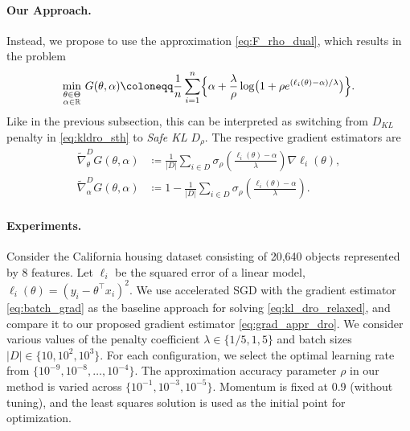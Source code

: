 \documentclass{article}
\newcommand{\R}{\mathbb{R}}
\newcommand*{\eqset}{\coloneqq}
\theoremstyle{plain}
\theoremstyle{definition}
\theoremstyle{remark}
\begin{document}
\paragraph{Our Approach.}
Instead, we propose to use the approximation \eqref{eq:F_rho_dual}, which results in the problem
\begin{equation}\label{eq:appr_kl_dro}
    \min_{\substack{\theta \in \Theta \\ \alpha \in \R}}\, G(\theta, \alpha) \eqset \frac{1}{n} \sum_{i=1}^n \Bigl\{ \alpha + \frac{\lambda}{\rho} \log \bigl(1 + \rho e^{(\ell_i(\theta) - \alpha) / \lambda} \bigr) \Bigr\}.
\end{equation}
Like in the previous subsection, this can be interpreted as switching from $D_{KL}$ penalty in \eqref{eq:kldro_sth} to \textit{Safe KL} $D_{\rho}$.
The respective gradient estimators are
\begin{equation}\label{eq:grad_appr_dro}
\begin{aligned}
    \tilde{\nabla}^D_{\theta} G(\theta, \alpha) &\eqset \frac{1}{|D|} \sum_{i\in D} \sigma_{\rho} \left( \textstyle\frac{\ell_i(\theta) - \alpha}{\lambda} \right) \nabla \ell_i(\theta), \\ 
    \tilde{\nabla}^D_{\alpha} G(\theta, \alpha) &\eqset 1 - \frac{1}{|D|} \sum_{i\in D} \sigma_{\rho} \left( \textstyle\frac{\ell_i(\theta) - \alpha}{\lambda} \right).
\end{aligned}
\end{equation}

\paragraph{Experiments.}
Consider the California housing dataset \citep{pace1997sparse} consisting of 20,640 objects represented by 8 features. Let $\ell_i$ be the squared error of a linear model, $\ell_i(\theta) = (y_i - \theta^\top x_i)^2$. We use accelerated SGD with the gradient estimator \eqref{eq:batch_grad} \citep{levy2020large} as the baseline approach for solving \eqref{eq:kl_dro_relaxed}, and compare it to our proposed gradient estimator \eqref{eq:grad_appr_dro}.  {We consider various values of the penalty coefficient $\lambda \in \{1/5, 1, 5\}$ and batch sizes $|D| \in \{10, 10^2, 10^3\}$. For each configuration, we select the optimal learning rate from $\{10^{-9}, 10^{-8}, \ldots, 10^{-4}\}$. The approximation accuracy parameter $\rho$ in our method is varied across $\{10^{-1}, 10^{-3}, 10^{-5}\}$. Momentum is fixed at 0.9 (without tuning), and the least squares solution is used as the initial point for optimization.}
\end{document}
